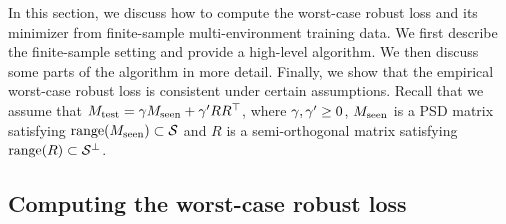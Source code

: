 
In this section, we discuss how to compute the worst-case robust loss and its minimizer from finite-sample multi-environment training data. We first describe the finite-sample setting and provide a high-level algorithm. We then discuss some parts of the algorithm in more detail. Finally, we show that the empirical worst-case robust loss is consistent under certain assumptions.  
Recall that we assume that $M_{\mathrm{test}} = \gamma M_{\mathrm{seen}} + \gamma' R R^\top$, where $\gamma, \gamma' \geq 0$, $M_{\mathrm{seen}} $ is a PSD matrix satisfying $\mathrm{range} (M_{\mathrm{seen}}) \subset \mathcal{S}$ and $R$ is a semi-orthogonal matrix satisfying $\mathrm{range} (R) \subset \mathcal{S}^\perp$. 

\subsection{Computing the worst-case robust loss}

